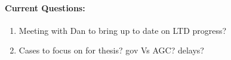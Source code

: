 \documentclass[12pt]{article}
\begin{document}
\begin{multicols}{2}
\begin{enumerate}
\end{enumerate}


\begin{comment}

\paragraph{Proposed MiniWECC test cases:} \ \\
duration: 4-6 hours
\begin{itemize}
	\itemsep0em 
\item system noise 
\item wind generation ramps 
\item daily load cycle (during peak/valley transition)
\end{itemize}

Control varaitions:\\
Normal gov deadband and large gov deadband \\
Fast (seconds) and slow (minutes) AGC
\\ Three cases: 
\begin{itemize}
	\itemsep0em 
\item normal gov, Slow AGC
\item normal gov, Fast AGC
\item large gov, Fast AGC
\end{itemize}

Experimental Measures:
\begin{itemize}
\itemsep 0em
\item Valve movement
\item NERC mandate adherence
\end{itemize}
\end{comment}


	\paragraph{Current Questions:}
	\begin{enumerate}
\itemsep0em 
	\item Meeting with Dan to bring up to date on LTD progress?
	
	\item Cases to focus on for thesis?
	\subitem gov Vs AGC?
	\subitem delays?
	\end{enumerate}
	



\begin{comment}

\end{comment}
\end{multicols}
\end{document}
